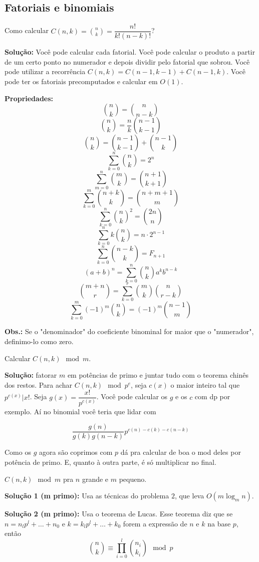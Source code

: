 \subsection{Fatoriais e binomiais}

 Como calcular $C(n, k) = {n \choose k} = \dfrac{n!}{k!(n-k)!}$?

\textbf{Solução:} Você pode calcular cada fatorial. Você pode calcular o produto a partir de um certo ponto no numerador e depois dividir pelo fatorial que sobrou. Você pode utilizar a recorrência $C(n, k) = C(n-1, k-1) + C(n-1, k)$. Você pode ter os fatoriais precomputados e calcular em $O(1)$.

\textbf{Propriedades:}
$$ {n \choose k} = {n \choose n -k}$$
$${n \choose k} = \dfrac{n}{k} {n-1 \choose k-1}$$
$${n \choose k} = {n-1 \choose k-1} + {n-1 \choose k}$$
$$\sum\limits_{k=0}^n {n \choose k} = 2^n$$
$$\sum\limits_{m=0}^n {m \choose k} = {n + 1 \choose k+1}$$
$$\sum\limits_{k=0}^m {n+k \choose k} = {n+m+1 \choose m}$$
$$\sum\limits_{k=0}^n {n \choose k}^2 = {2n \choose n}$$
$$\sum\limits_{k=0}^n k {n \choose k} = n \cdot 2^{n-1}$$
$$\sum\limits_{k=0}^n {n-k \choose k} = F_{n+1}$$
$$(a+b)^n = \sum\limits_{k=0}^n {n \choose k} a^k b^{n-k}$$
$${m + n \choose r} = \sum\limits_{k=0}^r {m \choose k} {n \choose r - k}$$
$$\sum\limits_{k=0}^m (-1)^m {n \choose k} = (-1)^m {n-1 \choose m}$$

\textbf{Obs.:} Se o "denominador" do coeficiente binominal for maior que o "numerador", definimo-lo como zero.

 Calcular $C(n, k) \mod m$.

\textbf{Solução:} fatorar $m$ em potências de primo e juntar tudo com o teorema chinês dos restos. Para achar $C(n, k) \mod p^e$, seja $c(x)$ o maior inteiro tal que $p^{c(x)} | x!$. Seja $g(x) = \dfrac{x!}{p^{c(x)}}$. Você pode calcular os $g$ e os $c$ com dp por exemplo. Aí no binomial você teria que lidar com

$$ \dfrac{g(n)}{g(k)g(n-k)} p^{c(n) - c(k) - c(n-k)}$$

Como os $g$ agora são coprimos com $p$ dá pra calcular de boa o mod deles por potência de primo. E, quanto à outra parte, é só multiplicar no final.

 $C(n, k) \mod m$ pra $n$ grande e $m$ pequeno.

\textbf{Solução 1 (m primo):} Usa as técnicas do problema $2$, que leva $O(m \log_m n)$.

\textbf{Solução 2 (m primo):} Usa o teorema de Lucas. Esse teorema diz que se $n = n_l p^l + \dots + n_0$ e $k = k_l p^l + \dots + k_0$ forem a expressão de $n$ e $k$ na base $p$, então
$$ {n \choose k} \equiv \prod\limits_{i=0}^l {n_i \choose k_i} \mod p$$

